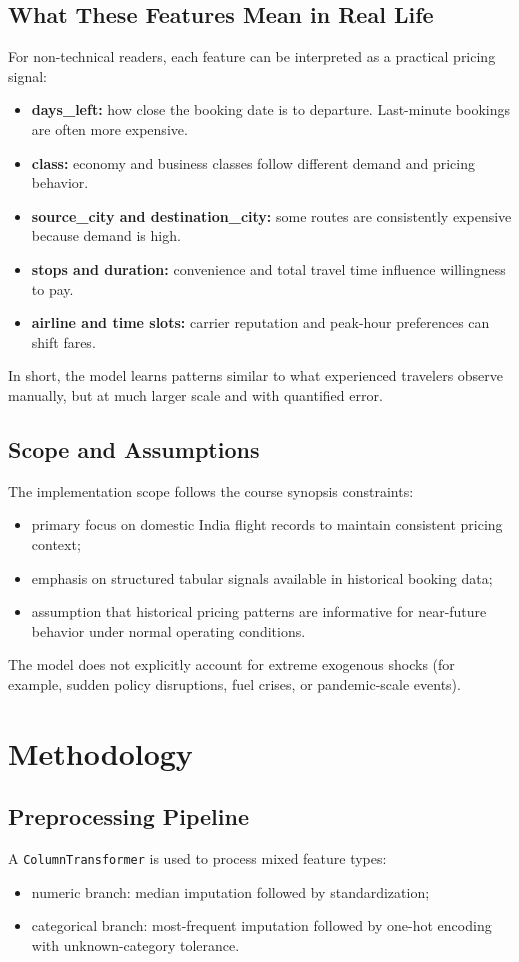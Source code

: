\documentclass[conference]{IEEEtran}
\begin{document}
\subsection{What These Features Mean in Real Life}
For non-technical readers, each feature can be interpreted as a practical pricing signal:
\begin{itemize}
\item \textbf{days\_left:} how close the booking date is to departure. Last-minute bookings are often more expensive.
\item \textbf{class:} economy and business classes follow different demand and pricing behavior.
\item \textbf{source\_city and destination\_city:} some routes are consistently expensive because demand is high.
\item \textbf{stops and duration:} convenience and total travel time influence willingness to pay.
\item \textbf{airline and time slots:} carrier reputation and peak-hour preferences can shift fares.
\end{itemize}

In short, the model learns patterns similar to what experienced travelers observe manually, but at much larger scale and with quantified error.

\subsection{Scope and Assumptions}
The implementation scope follows the course synopsis constraints:
\begin{itemize}
\item primary focus on domestic India flight records to maintain consistent pricing context;
\item emphasis on structured tabular signals available in historical booking data;
\item assumption that historical pricing patterns are informative for near-future behavior under normal operating conditions.
\end{itemize}

The model does not explicitly account for extreme exogenous shocks (for example, sudden policy disruptions, fuel crises, or pandemic-scale events).

\section{Methodology}
\subsection{Preprocessing Pipeline}
A \texttt{ColumnTransformer} is used to process mixed feature types:
\begin{itemize}
\item numeric branch: median imputation followed by standardization;
\item categorical branch: most-frequent imputation followed by one-hot encoding with unknown-category tolerance.
\end{itemize}
\end{document}
